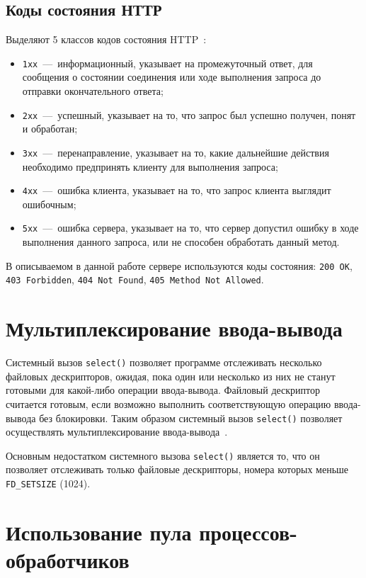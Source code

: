 \subsection{Коды состояния НТТР}
Выделяют 5 классов кодов состояния HTTP~\cite{rfc9110}:
\begin{itemize}
	\item \texttt{1xx}~---~информационный, указывает на промежуточный ответ, для сообщения о состоянии соединения или ходе выполнения запроса до отправки окончательного ответа;
	\item \texttt{2xx}~---~успешный, указывает на то, что запрос был успешно получен, понят и обработан;
	\item \texttt{3xx}~---~перенаправление, указывает на то, какие дальнейшие действия необходимо предпринять клиенту для выполнения запроса;
	\item \texttt{4xx}~---~ошибка клиента, указывает на то, что запрос клиента выглядит ошибочным;
	\item \texttt{5xx}~---~ошибка сервера, указывает на то, что сервер допустил ошибку в ходе выполнения данного запроса, или не способен обработать данный метод.
\end{itemize}

В описываемом в данной работе сервере используются коды состояния: \texttt{200 OK}, \texttt{403 Forbidden}, \texttt{404 Not Found}, \texttt{405 Method Not Allowed}.

\section{Мультиплексирование ввода-вывода}

Системный вызов \texttt{select()} позволяет программе отслеживать несколько файловых дескрипторов, ожидая, пока один или несколько из них не станут готовыми для какой-либо операции ввода-вывода. Файловый дескриптор считается готовым, если возможно выполнить соответствующую операцию ввода-вывода без блокировки. Таким образом системный вызов \texttt{select()} позволяет осуществлять мультиплексирование ввода-вывода~\cite{linux_select}.

Основным недостатком системного вызова \texttt{select()} является то, что он позволяет отслеживать только файловые дескрипторы, номера которых меньше \texttt{FD\_SETSIZE} (1024).

\section{Использование пула процессов-обработчиков}

